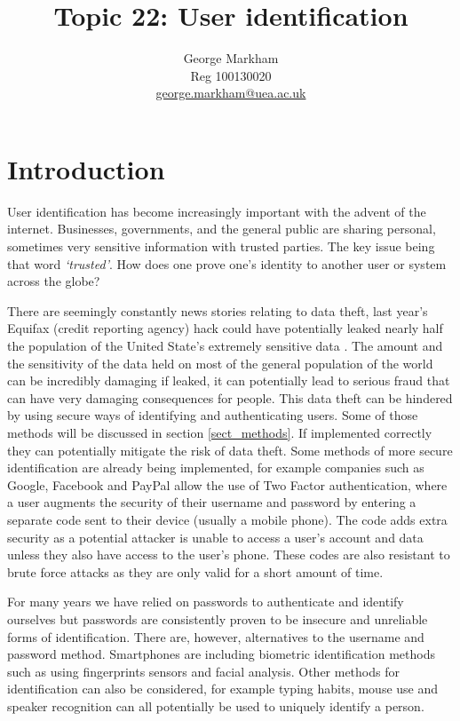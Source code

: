 \documentclass[12pt]{article}
\title{Topic 22: User identification}
\author{George Markham\\Reg 100130020\\\small \href{mailto:george.markham@uea.ac.uk}{george.markham@uea.ac.uk}}
\begin{document}
	
	\maketitle
	
	\begin{abstract}
	\end{abstract}
	
	\tableofcontents
	\newpage
	\section{Introduction}
	User identification has become increasingly important with the advent of the internet. Businesses, governments, and the general public are sharing personal, sometimes very sensitive information with trusted parties. The key issue being that word \emph{`trusted'}. How does one prove one's identity to another user or system across the globe? 
	
	There are seemingly constantly news stories relating to data theft, last year's Equifax (credit reporting agency) hack could have potentially leaked nearly half the population of the United State's extremely sensitive data \citep{equifax_cnet}. The amount and the sensitivity of the data held on most of the general population of the world can be incredibly damaging if leaked, it can potentially lead to serious fraud that can have very damaging consequences for people. This data theft can be hindered by using secure ways of identifying and authenticating users. Some of those methods will be discussed in section \ref{sect_methods}. If implemented correctly they can potentially mitigate the risk of data theft. Some methods of more secure identification are already being implemented, for example companies such as Google, Facebook and PayPal allow the use of Two Factor authentication, where a user augments the security of their username and password by entering a separate code sent to their device (usually a mobile phone). The code adds extra security as a potential attacker is unable to access a user's account and data unless they also have access to the user's phone. These codes are also resistant to brute force attacks as they are only valid for a short amount of time.
	
	For many years we have relied on passwords to authenticate and identify ourselves but passwords are consistently proven to be insecure and unreliable forms of identification. There are, however, alternatives to the username and password method. Smartphones are including biometric identification methods such as using fingerprints sensors and facial analysis. Other methods for identification can also be considered, for example typing habits, mouse use and speaker recognition can all potentially be used to uniquely identify a person.
	
\end{document}
